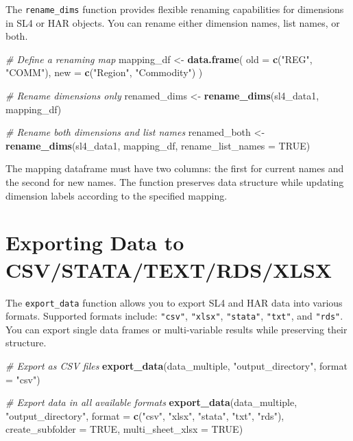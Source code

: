 \documentclass[
]{article}
\newenvironment{Shaded}{\begin{snugshade}}{\end{snugshade}}
\newcommand{\AttributeTok}[1]{\textcolor[rgb]{0.13,0.29,0.53}{#1}}
\newcommand{\CommentTok}[1]{\textcolor[rgb]{0.56,0.35,0.01}{\textit{#1}}}
\newcommand{\ConstantTok}[1]{\textcolor[rgb]{0.56,0.35,0.01}{#1}}
\newcommand{\FunctionTok}[1]{\textcolor[rgb]{0.13,0.29,0.53}{\textbf{#1}}}
\newcommand{\NormalTok}[1]{#1}
\newcommand{\OtherTok}[1]{\textcolor[rgb]{0.56,0.35,0.01}{#1}}
\newcommand{\StringTok}[1]{\textcolor[rgb]{0.31,0.60,0.02}{#1}}
\begin{document}
The \texttt{rename\_dims} function provides flexible renaming
capabilities for dimensions in SL4 or HAR objects. You can rename either
dimension names, list names, or both.

\begin{Shaded}
\begin{Highlighting}[]
\CommentTok{\# Define a renaming map}
\NormalTok{mapping\_df }\OtherTok{\textless{}{-}} \FunctionTok{data.frame}\NormalTok{(}
 \AttributeTok{old =} \FunctionTok{c}\NormalTok{(}\StringTok{"REG"}\NormalTok{, }\StringTok{"COMM"}\NormalTok{),}
 \AttributeTok{new =} \FunctionTok{c}\NormalTok{(}\StringTok{"Region"}\NormalTok{, }\StringTok{"Commodity"}\NormalTok{)}
\NormalTok{)}

\CommentTok{\# Rename dimensions only}
\NormalTok{renamed\_dims }\OtherTok{\textless{}{-}} \FunctionTok{rename\_dims}\NormalTok{(sl4\_data1, mapping\_df)}

\CommentTok{\# Rename both dimensions and list names}
\NormalTok{renamed\_both }\OtherTok{\textless{}{-}} \FunctionTok{rename\_dims}\NormalTok{(sl4\_data1, mapping\_df, }\AttributeTok{rename\_list\_names =} \ConstantTok{TRUE}\NormalTok{)}
\end{Highlighting}
\end{Shaded}

The mapping dataframe must have two columns: the first for current names
and the second for new names. The function preserves data structure
while updating dimension labels according to the specified mapping.

\section{Exporting Data to
CSV/STATA/TEXT/RDS/XLSX}\label{exporting-data-to-csvstatatextrdsxlsx}

The \texttt{export\_data} function allows you to export SL4 and HAR data
into various formats. Supported formats include: \texttt{"csv"},
\texttt{"xlsx"}, \texttt{"stata"}, \texttt{"txt"}, and \texttt{"rds"}.
You can export single data frames or multi-variable results while
preserving their structure.

\begin{Shaded}
\begin{Highlighting}[]
\CommentTok{\# Export as CSV files}
\FunctionTok{export\_data}\NormalTok{(data\_multiple, }\StringTok{"output\_directory"}\NormalTok{, }
            \AttributeTok{format =} \StringTok{"csv"}\NormalTok{)}

\CommentTok{\# Export data in all available formats }
\FunctionTok{export\_data}\NormalTok{(data\_multiple, }\StringTok{"output\_directory"}\NormalTok{, }
           \AttributeTok{format =} \FunctionTok{c}\NormalTok{(}\StringTok{"csv"}\NormalTok{, }\StringTok{"xlsx"}\NormalTok{, }\StringTok{"stata"}\NormalTok{, }\StringTok{"txt"}\NormalTok{, }\StringTok{"rds"}\NormalTok{),}
           \AttributeTok{create\_subfolder =} \ConstantTok{TRUE}\NormalTok{,}
           \AttributeTok{multi\_sheet\_xlsx =} \ConstantTok{TRUE}\NormalTok{)}
\end{Highlighting}
\end{Shaded}
\end{document}
